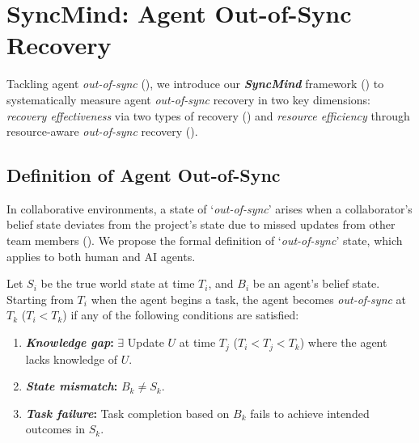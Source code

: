 \section{SyncMind: Agent Out-of-Sync Recovery}
\label{Section: framework}


Tackling agent \textit{out-of-sync} (), we introduce our \textbf{\textit{SyncMind}} framework () to systematically measure agent \textit{out-of-sync} recovery in two key dimensions: \textit{recovery effectiveness} via two types of recovery () and \textit{resource efficiency} through resource-aware \textit{out-of-sync} recovery ().

\subsection{Definition of Agent Out-of-Sync}
\label{Section: Definition of Agent Out-of-Sync}

In collaborative environments, a state of `\textit{out-of-sync}' arises when a collaborator's belief state deviates from the project's state due to missed updates from other team members (). We propose the formal definition of `\textit{out-of-sync}' state, which applies to both human and AI agents.


Let $S_i$ be the true world state at time $T_i$, and $B_i$ be an agent's belief state. Starting from $T_i$ when the agent begins a task, the agent becomes \textit{out-of-sync} at $T_k$ ($T_i<T_k$) if any of the following conditions are satisfied:
\vspace{-5pt}
\begin{enumerate}[leftmargin=*,itemsep=1pt,topsep=0pt,parsep=0pt,label=(\arabic*)]
    \item \textbf{\textit{Knowledge gap}:} $\exists$ Update $U$ at time $T_j$ ($T_i<T_j<T_k$) where the agent lacks knowledge of $U$.
    \item \textbf{\textit{State mismatch}:} $B_k \neq S_k$.
    \item \textbf{\textit{Task failure}:} Task completion based on $B_k$ fails to achieve intended outcomes in $S_k$.
\end{enumerate}

